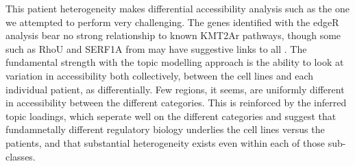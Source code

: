This patient heterogeneity makes differential accessibility analysis such as the one we attempted to perform very challenging. The genes identified with the edgeR analysis bear no strong relationship to known KMT2Ar pathways, though some such as RhoU and SERF1A from  may have suggestive links to \gls{all} \cite{Infante2013a,Z2020,Wilson2016}. The fundamental strength with the topic modelling approach is the ability to look at variation in accessibility both collectively, between the cell lines and each individual patient, as differentially. Few regions, it seems, are uniformly different in accessibility between the different categories. This is reinforced by the inferred topic loadings, which seperate well on the different categories and suggest that fundamnetally different regulatory biology underlies the cell lines versus the patients, and that substantial heterogeneity exists even within each of those sub-classes. 

